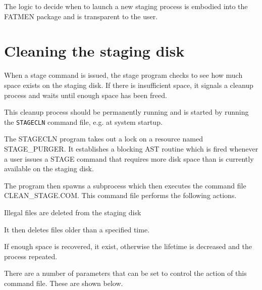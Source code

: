The logic to decide when to launch a new staging process is
embodied into the FATMEN package and is transparent to the user.

\section{Cleaning the staging disk}

When a stage command is issued, the stage program checks to
see how much space exists on the staging disk. If there is
insufficient space, it signals a cleanup process and waits
until enough space has been freed.

This cleanup process should be permanently running and is
started by running the {\tt STAGECLN} command file, e.g.
at system startup.

The STAGECLN program takes out a lock on a resource named
STAGE\_PURGER. It establishes a blocking AST routine which
is fired whenever a user issues a STAGE command that requires
more disk space than is currently available on the staging disk.

The program then spawns a subprocess which then executes the command
file CLEAN\_STAGE.COM. This command file performs the following actions.

\begin{OL}
\item
Illegal files are deleted from the staging disk
\item
It then deletes files older than a specified time.
\item
If enough space is recovered, it exist, otherwise
the lifetime is decreased and the process repeated.
\end{OL}

There are a number of parameters that can be set to
control the action of this command file. These are
shown below.

